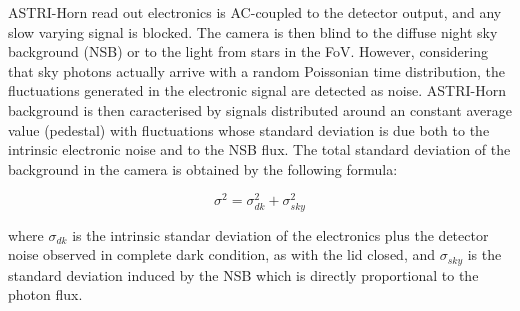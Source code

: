 ASTRI-Horn read out electronics is AC-coupled to the detector output, and any slow varying signal is  blocked.
The camera is then blind to the diffuse night sky background (NSB) or to the light from stars in the FoV.   However, considering that sky photons actually arrive with a random Poissonian time distribution, the fluctuations generated in the electronic signal are detected as noise. ASTRI-Horn  background is then caracterised by signals distributed around an constant average value (pedestal) with fluctuations whose standard deviation is due both to the intrinsic electronic noise and to the NSB flux.  The total standard deviation of the background in the camera is obtained by the following formula:

\begin{equation}
\sigma^2=\sigma^2_{dk}+\sigma^2_{sky}
\end{equation}

\noindent
where $\sigma_{dk}$ is the intrinsic standar deviation of the electronics plus the detector noise observed in complete dark condition, as with the lid closed, and $\sigma_{sky}$ is the standard deviation induced by the  NSB  which is directly proportional to the photon flux.

